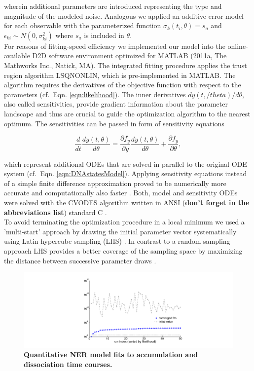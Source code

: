 wherein additional parameters are introduced representing the type and magnitude of the modeled noise. Analogous we applied an additive error model for each observable with the parameterized function $\sigma_{k}(t_i,\theta) = s_a$ and $\epsilon_{ki} \sim N(0,\sigma_{ki}^2)$ where $s_a$ is included in $\theta$.\\ 
For reasons of fitting-speed efficiency we implemented our model into the online-available D2D software environment \cite{Raue2013} optimized for MATLAB (2011a, The Mathworks Inc., Natick, MA). The integrated fitting procedure applies the trust region algorithm LSQNONLIN, which is pre-implemented in MATLAB. The algorithm requires the derivatives of the objective function with respect to the parameters (cf.\ Eqn. \ref{eqn:likelihood}). The inner derivatives $dy(t,/theta)/d\theta$, also called sensitivities, provide gradient information about the parameter landscape and thus are crucial to guide the optimization algorithm to the nearest optimum. The sensitivities can be passed in form of sensitivity equations 

\begin{equation}
	\frac{d}{dt}\frac{dy(t,\theta)}{d\theta} = \frac{\partial f_y}{\partial y}\frac{dy(t,\theta)}{d\theta}+\frac{\partial f_y}{\partial \theta},
\end{equation}  

which represent additional ODEs that are solved in parallel to the original ODE system (cf.\ Eqn. \ref{eqn:DNAstatesModel})\cite{Leis1988}. Applying sensitivity equations instead of a simple finite difference approximation proved to be numerically more accurate and computationally also faster \cite{Raue2013}. Both, model and sensitivity ODEs were solved with the CVODES algorithm written in ANSI (\textbf{don't forget in the abbreviations list}) standard C \cite{Hindmarsh2005}. \\
To avoid terminating the optimization procedure in a local minimum we used a 'multi-start' approach by drawing the initial parameter vector systematically using Latin hypercube sampling (LHS) \cite{Owen2014}. In contrast to a random sampling approach LHS provides a better coverage of the sampling space by maximizing the distance between successive parameter draws \cite{Raue2013}.    

\begin{figure}[htbp]
\begin{center}
\includegraphics[width=1\textwidth]{Abbildungen/figure2_6_4.pdf}
\caption{\textbf{Quantitative NER model fits to accumulation and dissociation time courses.}  }
\label{fig:LHS}
\end{center}
\end{figure} 

